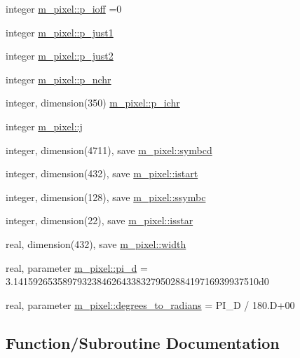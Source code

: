\begin{DoxyCompactItemize}
\item 
integer \mbox{\hyperlink{namespacem__pixel_a7dfccfa543f53e4f6bd06a28f963ee69}{m\+\_\+pixel\+::p\+\_\+ioff}} =0
\item 
integer \mbox{\hyperlink{namespacem__pixel_aea6d1d5a4f88e0b07db43e92463bb065}{m\+\_\+pixel\+::p\+\_\+just1}}
\item 
integer \mbox{\hyperlink{namespacem__pixel_a9d00991f1ff7ed891170100d8e9d64f0}{m\+\_\+pixel\+::p\+\_\+just2}}
\item 
integer \mbox{\hyperlink{namespacem__pixel_a70edd7b43b9667a9d304b3028f113cc8}{m\+\_\+pixel\+::p\+\_\+nchr}}
\item 
integer, dimension(350) \mbox{\hyperlink{namespacem__pixel_a34ef1aad7a3aa45df090b226788a2d2c}{m\+\_\+pixel\+::p\+\_\+ichr}}
\item 
integer \mbox{\hyperlink{namespacem__pixel_a1faa00d5ad36016f8c9f4522a2391209}{m\+\_\+pixel\+::j}}
\item 
integer, dimension(4711), save \mbox{\hyperlink{namespacem__pixel_a3da3613bd8dfa6a15b7d0aa3db1f9eb5}{m\+\_\+pixel\+::symbcd}}
\item 
integer, dimension(432), save \mbox{\hyperlink{namespacem__pixel_af41ef8a6b53ec63db42172fab83ecbfa}{m\+\_\+pixel\+::istart}}
\item 
integer, dimension(128), save \mbox{\hyperlink{namespacem__pixel_a2b75d036a498ac0c68380803a0f1d538}{m\+\_\+pixel\+::ssymbc}}
\item 
integer, dimension(22), save \mbox{\hyperlink{namespacem__pixel_a6f8d92e6b4c33e62399d3286448b76fa}{m\+\_\+pixel\+::isstar}}
\item 
real, dimension(432), save \mbox{\hyperlink{namespacem__pixel_abf266872f93a04af39d2903fb20d2a0d}{m\+\_\+pixel\+::width}}
\item 
real, parameter \mbox{\hyperlink{namespacem__pixel_a51ed97a239a2e633db7f4a5cf7e61006}{m\+\_\+pixel\+::pi\+\_\+d}} = 3.\+14159265358979323846264338327950288419716939937510d0
\item 
real, parameter \mbox{\hyperlink{namespacem__pixel_ae2cb6913bb1501cb9872cb874a6c283e}{m\+\_\+pixel\+::degrees\+\_\+to\+\_\+radians}} = P\+I\+\_\+D / 180.\+D+00
\end{DoxyCompactItemize}


\subsection{Function/\+Subroutine Documentation}
\mbox{\label{M__pixel_8f90_aaa8ee15f943d8e1543ae35ab732c3cd2}} 
